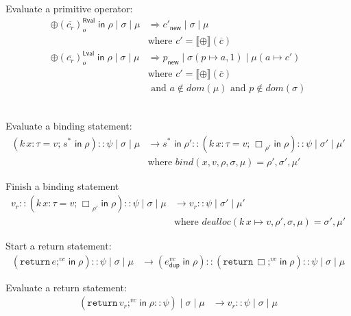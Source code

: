 \documentclass{article}
\newcommand{\SC}{\texttt{;}}
\newcommand{\EQ}{\mathop{\texttt{=}}}
\newcommand{\IN}{\mathop{\mathsf{in}}}
\newcommand{\RVAL}{\mathsf{Rval}}
\newcommand{\LVAL}{\mathsf{Lval}}
\newcommand{\DUP}{\mathsf{dup}}
\newcommand{\INCTX}[4]{\boxed{#1}^{#2}_{#3} \IN #4}
\begin{document}
\noindent Evaluate a primitive operator:
\begin{align*}
\INCTX{\oplus(\overline{c_r})}{\RVAL}{o}{\rho} \mid \sigma \mid \mu &
  \Rightarrow c'_{\mathsf{new}} \mid \sigma \mid \mu \\
  & \text{where } c' = \llbracket \oplus \rrbracket (\overline{c}) \\
\boxed{\oplus(\overline{c_r})}^\LVAL_o \IN \rho \mid \sigma \mid \mu &
     \Rightarrow p_{\mathsf{new}} \mid \sigma(p \mapsto a,1) \mid \mu(a \mapsto c') \\
     & \text{where } c' = \llbracket \oplus \rrbracket (\overline{c})\\
    & \text{ and } a \notin \mathit{dom}(\mu)
     \text{ and } p \notin \mathit{dom}(\sigma)
\end{align*}



\fbox{$\psi \mid \sigma \mid \mu \longrightarrow \psi \mid \sigma \mid \mu$}\\

\noindent Evaluate a binding statement:
\begin{align*}
  (\INCTX{k\,x:\tau \EQ v\SC \; s^{*}}{}{}{\rho}) :: \psi \mid \sigma \mid \mu &
  \longrightarrow
  \INCTX{s^{*}}{}{}{\rho'} ::
  (\INCTX{k\,x:\tau \EQ v\SC \; \Box}{}{\rho'}{\rho}) :: \psi \mid \sigma' \mid \mu'\\
  & \text{where }
    \mathit{bind}(x, v,\rho,\sigma,\mu) = \rho',\sigma',\mu'
\end{align*}

\noindent Finish a binding statement
\begin{align*}
  v_r :: (\INCTX{k\,x:\tau \EQ v\SC \; \Box}{}{\rho'}{\rho}) :: \psi
    \mid \sigma \mid \mu
 &\longrightarrow
    v_r :: \psi \mid \sigma' \mid \mu' \\
 & \text{where } \mathit{dealloc}(k\,x\mapsto v,\rho',\sigma,\mu) = \sigma', \mu'
\end{align*}

\noindent Start a return statement:
\begin{align*}
  (\INCTX{\mathtt{return}\,e \SC}{vc}{}{\rho}) :: \psi \mid \sigma \mid \mu
  & \longrightarrow
  (\INCTX{e}{vc}{\DUP}{\rho}):: (\INCTX{\mathtt{return}\,\Box \SC}{vc}{}{\rho}) :: \psi \mid \sigma \mid \mu
\end{align*}

\noindent Evaluate a return statement:
\begin{align*}
  (\INCTX{\mathtt{return}\,v_r \SC}{vc}{}{\rho} :: \psi) \mid \sigma \mid \mu
  & \longrightarrow
  v_r :: \psi \mid \sigma \mid \mu
\end{align*}
\end{document}
